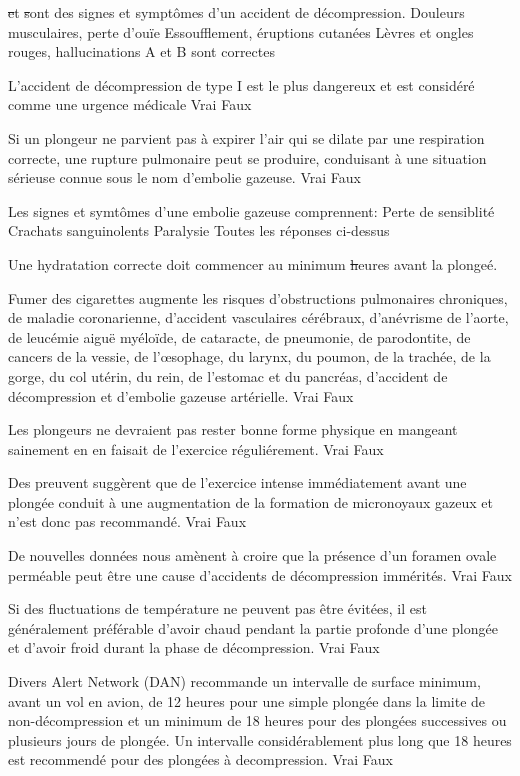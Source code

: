 \documentclass[english,10pt,a4paper,twoside]{article}
\begin{document}
\begin{outline}
		\1 \st et \st sont des signes et symptômes d'un accident de décompression.
			\2 Douleurs musculaires, perte d'ouïe
			\2 Essoufflement, éruptions cutanées
			\2 Lèvres et ongles rouges, hallucinations
			\2 A et B sont correctes

		\1 L'accident de décompression de type I est le plus dangereux et est considéré comme une urgence médicale
			\2 Vrai
			\2 Faux

		\1 Si un plongeur ne parvient pas à expirer l'air qui se dilate par une respiration correcte, une rupture pulmonaire peut se produire, conduisant à une situation sérieuse connue sous le nom d'embolie gazeuse.
			\2 Vrai
			\2 Faux

		\1 Les signes et symtômes d'une embolie gazeuse comprennent:
			\2 Perte de sensiblité
			\2 Crachats sanguinolents
			\2 Paralysie
			\2 Toutes les réponses ci-dessus

		\1 Une hydratation correcte doit commencer au minimum	\st heures avant la plongeé.

		\1 Fumer des cigarettes augmente les risques d'obstructions pulmonaires chroniques, de maladie coronarienne, d'accident vasculaires cérébraux, d'anévrisme de l'aorte, de leucémie aiguë myéloïde, de cataracte, de pneumonie, de parodontite, de cancers de la vessie, de l'œsophage, du larynx, du poumon, de la trachée, de la gorge, du col utérin, du rein, de l'estomac et du pancréas, d'accident de décompression et d'embolie gazeuse artérielle.
			\2 Vrai
			\2 Faux

		\1 Les plongeurs ne devraient pas rester bonne forme physique en mangeant sainement en en faisait de l'exercice réguliérement.
			\2 Vrai
			\2 Faux

		\1 Des preuvent suggèrent que de l'exercice intense immédiatement avant une plongée conduit à une augmentation de la formation de micronoyaux gazeux et n'est donc pas recommandé.
			\2 Vrai
			\2 Faux

		\1 De nouvelles données nous amènent à croire que la présence d'un foramen ovale perméable peut être une cause d'accidents de décompression immérités.
			\2 Vrai
			\2 Faux

		\1 Si des fluctuations de température ne peuvent pas être évitées, il est généralement préférable d'avoir chaud pendant la partie profonde d'une plongée et d'avoir froid durant la phase de décompression.
			\2 Vrai
			\2 Faux

		\1 Divers Alert Network (DAN) recommande un intervalle de surface minimum, avant un vol en avion, de 12 heures pour une simple plongée dans la limite de non-décompression et un minimum de 18 heures pour des plongées successives ou plusieurs jours de plongée. Un intervalle considérablement plus long que 18 heures est recommendé pour des plongées à decompression.
			\2 Vrai
			\2 Faux


\end{outline}
\end{document}
